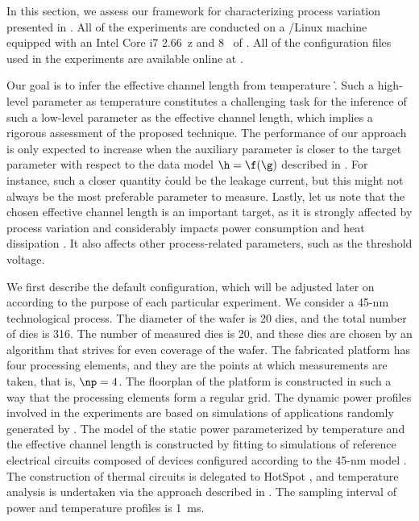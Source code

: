In this section, we assess our framework for characterizing process variation
presented in . All of the experiments are conducted on a
/Linux machine equipped with an Intel Core i7 2.66~z and
8~ of . All of the configuration files used in the experiments
are available online at \cite{eslab2014a}.

Our goal is to infer the effective channel length \g from temperature \h. Such a
high-level parameter as temperature constitutes a challenging task for the
inference of such a low-level parameter as the effective channel length, which
implies a rigorous assessment of the proposed technique. The performance of our
approach is only expected to increase when the auxiliary parameter \h is closer
to the target parameter \g with respect to the data model $\h = \f(\g)$
described in . For instance, such a closer quantity \h
could be the leakage current, but this might not always be the most preferable
parameter to measure. Lastly, let us note that the chosen effective channel
length is an important target, as it is strongly affected by process variation
and considerably impacts power consumption and heat dissipation
\cite{chandrakasan2000, srivastava2010, juan2011, juan2012}. It also affects
other process-related parameters, such as the threshold voltage.

We first describe the default configuration, which will be adjusted later on
according to the purpose of each particular experiment. We consider a 45-nm
technological process. The diameter of the wafer is 20 dies, and the total
number of dies \nd is 316. The number of measured dies \hnd is 20, and these
dies are chosen by an algorithm that strives for even coverage of the wafer. The
fabricated platform has four processing elements, and they are the points at
which measurements are taken, that is, $\np = 4$. The floorplan of the platform
is constructed in such a way that the processing elements form a regular grid.
The dynamic power profiles involved in the experiments are based on simulations
of applications randomly generated by  \cite{dick1998}. The model of
the static power parameterized by temperature and the effective channel length
is constructed by fitting to  simulations of reference electrical
circuits composed of  devices \cite{bsim} configured according to the
45-nm   model \cite{ptm}. The construction of thermal 
circuits is delegated to HotSpot \cite{skadron2003}, and temperature analysis is
undertaken via the approach described in . The sampling
interval of power and temperature profiles is 1~ms.

